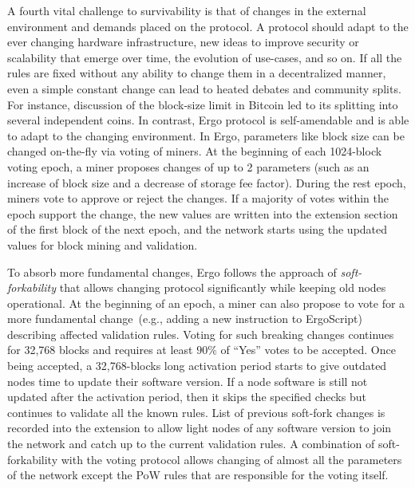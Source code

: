 A fourth vital challenge to survivability is that of changes in the external environment and demands placed on the protocol.
A protocol should adapt to the ever changing hardware infrastructure, new ideas to improve security or
scalability that emerge over time, the evolution of use-cases, and so on.
If all the rules are fixed without any ability to change them in a decentralized manner, even
a simple constant change can lead to heated debates and community splits. For instance,  discussion of the block-size limit in Bitcoin led to its splitting into several independent coins.
In contrast, Ergo protocol is self-amendable and is able to adapt to the changing environment.
In Ergo, parameters like block size can be changed on-the-fly via voting of miners.
At the beginning of each 1024-block voting epoch, a miner proposes changes of up to 2 parameters (such as an increase of block size and a decrease of storage fee factor). During the rest epoch, miners vote to approve or reject the changes.
If a majority of votes within the epoch support the change, the new values are written into the extension section of the first block of the next epoch, and
the network starts using the updated values for block mining and validation.

To absorb more fundamental changes, Ergo follows the approach of {\em soft-forkability} that
allows changing protocol significantly while keeping old nodes operational.
At the beginning of an epoch, a miner can also propose to vote for a more fundamental change~(e.g., adding a new instruction to ErgoScript) describing affected validation rules.
Voting for such breaking changes continues for 32,768 blocks and requires at least $90\%$ of
``Yes'' votes to be accepted. Once being accepted, a 32,768-blocks long activation period starts to give outdated nodes time to update their software version.
If a node software is still not updated after the activation period, then it skips the specified checks but continues to validate all the known rules.
List of previous soft-fork changes is recorded into the extension to allow light nodes of
any software version to join the network and catch up to the current validation rules.
A combination of soft-forkability with the voting protocol allows changing of almost all the parameters of the network except the PoW rules that are responsible for the voting itself.
